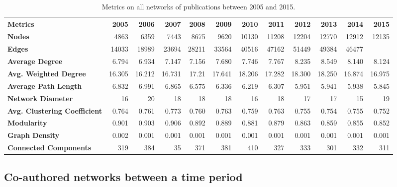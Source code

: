 \documentclass{article}
\begin{document}
\begin{multicols}{2}

\begin{table}[hb]
\centering
\caption{Metrics on all networks of publications between 2005 and 2015.}
\label{tab:table4}
\vspace{0.1cm}
\begin{tabular}{l|rrrrrrrrrrr}

\textbf{Metrics} & \textbf{2005} & \textbf{2006} & \textbf{2007} & \textbf{2008} & \textbf{2009} & \textbf{2010} & \textbf{2011} & \textbf{2012} & \textbf{2013} & \textbf{2014} & \textbf{2015}\\
\hline

\textbf{Nodes} & 4863 & 6359 & 7443 & 8675 & 9620 & 10130 & 11208 & 12204 & 12770 & 12912 & 12135 \\
\textbf{Edges} & 14033 & 18989 & 23694 & 28211 & 33564 & 40516 & 47162 & 51449 & 49384 & 46477 \\
\textbf{Average Degree} & 6.794 & 6.934 & 7.147 & 7.156 & 7.680 & 7.746 & 7.767 & 8.235 & 8.549 & 8.140 & 8.124 \\
\textbf{Avg. Weighted Degree} & 16.305 & 16.212 & 16.731 & 17.21 & 17.641 & 18.206 & 17.282 & 18.300 & 18.250 & 16.874 & 16.975 \\
\textbf{Average Path Length} & 6.832 & 6.991 & 6.865 & 6.575 & 6.336 & 6.219 & 6.307 & 5.951 & 5.941 & 5.938 & 5.845 \\
\textbf{Network Diameter} & 16 & 20 & 18 & 18 & 18 & 16 & 18 & 17 & 17 & 15 & 19 \\
\textbf{Avg. Clustering Coefficient} & 0.764 & 0.761 & 0.773 & 0.760 & 0.763 & 0.759 & 0.763 & 0.755 & 0.754 & 0.755 & 0.752 \\
\textbf{Modularity} & 0.901 & 0.903 & 0.906 & 0.892 & 0.889 & 0.881 & 0.879 & 0.863 & 0.859 & 0.855 & 0.852 \\
\textbf{Graph Density} & 0.002 & 0.001 & 0.001 & 0.001 & 0.001 & 0.001 & 0.001 & 0.001 & 0.001 & 0.001 & 0.001 \\
\textbf{Connected Components} & 319 & 384 & 35 & 371 & 381 & 410 & 327 & 333 & 301 & 332 & 311 \\

\end{tabular}
\end{table}


\newpage


\subsection{Co-authored networks between a time period}



\end{multicols}
\end{document}
